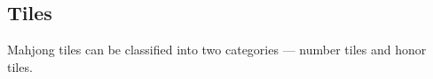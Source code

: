 \subsection{Tiles}

Mahjong tiles can be classified into two categories --- number tiles and honor tiles.

%
%
%
%
%
%
